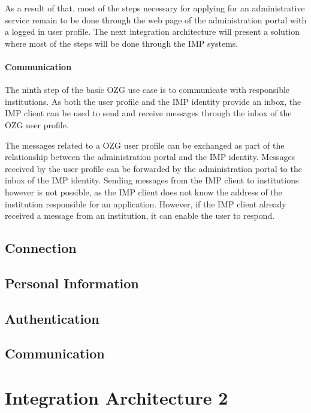 \documentclass[
     12pt,         %
     a4paper,      %
     BCOR=10mm,version=first,     %
     DIV=14,version=first,        %
     ]{scrreprt}
\begin{document}
As a result of that, most of the steps necessary for applying for an administrative service remain to be done through the web page of the administration portal with a logged in user profile. The next integration architecture will present a solution where most of the steps will be done through the IMP systems.

\paragraph{Communication}

The ninth step of the basic OZG use case is to communicate with responsible institutions. As both the user profile and the IMP identity provide an inbox, the IMP client can be used to send and receive messages through the inbox of the OZG user profile.

The messages related to a OZG user profile can be exchanged as part of the relationship between the administration portal and the IMP identity. Messages received by the user profile can be forwarded by the administration portal to the inbox of the IMP identity. Sending messages from the IMP client to institutions however is not possible, as the IMP client does not know the address of the institution responsible for an application. However, if the IMP client already received a message from an institution, it can enable the user to respond.


\subsection{Connection}

\subsection{Personal Information}

\subsection{Authentication}

\subsection{Communication}

\section{Integration Architecture 2}
\end{document}
